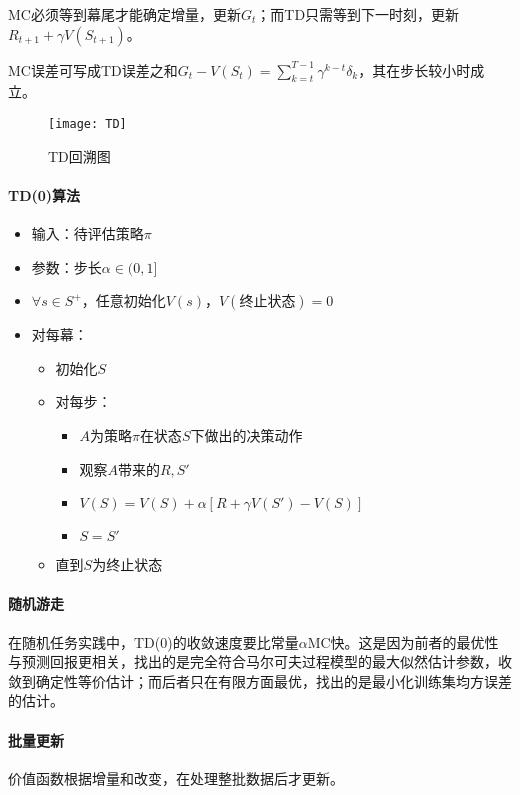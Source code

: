 \documentclass[
12pt, %
a4paper, 
oneside, %
headinclude,footinclude, %
]{scrartcl}
\begin{document}
MC必须等到幕尾才能确定增量，更新$ G_t $；而TD只需等到下一时刻，更新$ R_{t + 1} + \gamma V(S_{t + 1}) $。

MC误差可写成TD误差之和$ G_t - V(S_t) = \sum_{k = t}^{T - 1} \gamma^{k - t} \delta_k $，其在步长较小时成立。

\begin{figure}[H]
\centering
\texttt{[image: TD]}
\caption[TD回溯图]{TD回溯图}
\end{figure}
\paragraph{TD(0)算法}
\begin{itemize}
\item 输入：待评估策略$ \pi $
\item 参数：步长$ \alpha \in (0,1] $
\item $ \forall s \in S^+ $，任意初始化$ V(s) $，$ V(\text{终止状态}) = 0 $
\item 对每幕：
\begin{itemize}
\item 初始化$ S $
\item 对每步：
\begin{itemize}
\item $ A $为策略$ \pi $在状态$ S $下做出的决策动作
\item 观察$ A $带来的$ R, S' $
\item $ V(S) = V(S) + \alpha[R + \gamma V(S') - V(S)] $
\item $ S = S' $
\end{itemize}
\item 直到$ S $为终止状态
\end{itemize}
\end{itemize}
\paragraph{随机游走}
在随机任务实践中，TD(0)的收敛速度要比常量$ \alpha $MC快。这是因为前者的最优性与预测回报更相关，找出的是完全符合马尔可夫过程模型的最大似然估计参数，收敛到确定性等价估计；而后者只在有限方面最优，找出的是最小化训练集均方误差的估计。
\paragraph{批量更新}
价值函数根据增量和改变，在处理整批数据后才更新。
\end{document}
